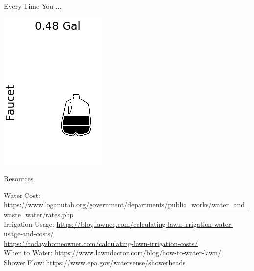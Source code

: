 \documentclass[paperwidth=11in,paperheight=8.5in,fontscale=1]{baposter} %
\begin{document}
\begin{poster}
\begin{posterbox}[column=0,row=.05,span=1,textborder=rounded,headerborder=open,height=.6,name=misc,textfont=\footnotesize, boxheaderheight=.25in]{ Every Time You ...}
\begin{minipage}[b][][b]{.24\textwidth}
		\includegraphics[width=\textwidth]{Faucet_icon.png}
\end{minipage}



\end{posterbox}


\begin{posterbox}[column=0,row=.8,span=2,textborder=rounded,headerborder=open,height=.2,name=misc,textfont=\footnotesize, boxheaderheight=.25in]{\footnotesize Resources}

Water Cost: \url{https://www.loganutah.org/government/departments/public_works/water_and_waste_water/rates.php}\\
Irrigation Usage: \url{https://blog.lawneq.com/calculating-lawn-irrigation-water-usage-and-costs/}\\
\-\phantom{Irrigation Usage:} \url{https://todayshomeowner.com/calculating-lawn-irrigation-costs/}\\
When to Water: \url{https://www.lawndoctor.com/blog/how-to-water-lawn/}\\
Shower Flow: \url{https://www.epa.gov/watersense/showerheads}



\end{posterbox}
\end{poster}
\end{document}
